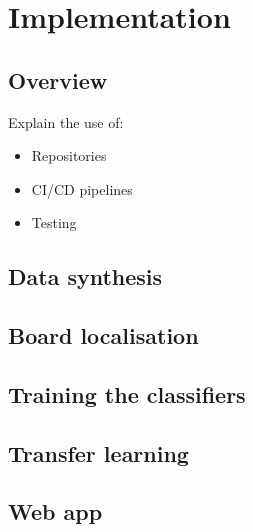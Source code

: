 \documentclass[../main.tex]{subfiles}
\begin{document}
\chapter{Implementation}

\section{Overview}

Explain the use of:
\begin{itemize}
    \item Repositories
    \item CI/CD pipelines
    \item Testing
\end{itemize}

\section{Data synthesis}
\section{Board localisation}
\section{Training the classifiers}
\section{Transfer learning}
\section{Web app}
\end{document}

